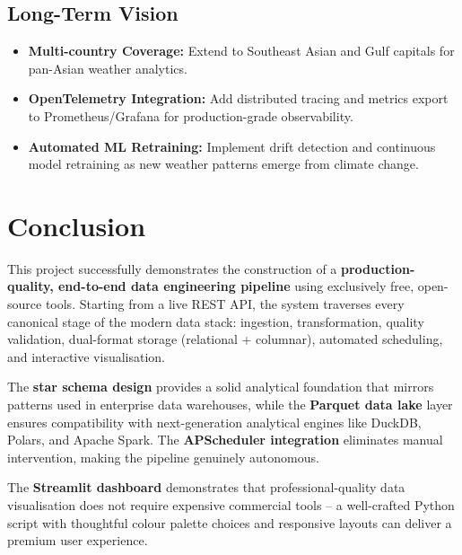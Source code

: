 \documentclass[12pt,a4paper]{report}
\begin{document}
\section{Long-Term Vision}

\begin{itemize}
  \item \textbf{Multi-country Coverage:} Extend to Southeast Asian and Gulf capitals for pan-Asian weather analytics.
  \item \textbf{OpenTelemetry Integration:} Add distributed tracing and metrics export to Prometheus/Grafana for production-grade observability.
  \item \textbf{Automated ML Retraining:} Implement drift detection and continuous model retraining as new weather patterns emerge from climate change.
\end{itemize}

\chapter{Conclusion}

This project successfully demonstrates the construction of a \textbf{production-quality, end-to-end data engineering pipeline} using exclusively free, open-source tools. Starting from a live REST API, the system traverses every canonical stage of the modern data stack: ingestion, transformation, quality validation, dual-format storage (relational + columnar), automated scheduling, and interactive visualisation.

The \textbf{star schema design} provides a solid analytical foundation that mirrors patterns used in enterprise data warehouses, while the \textbf{Parquet data lake} layer ensures compatibility with next-generation analytical engines like DuckDB, Polars, and Apache Spark. The \textbf{APScheduler integration} eliminates manual intervention, making the pipeline genuinely autonomous.

The \textbf{Streamlit dashboard} demonstrates that professional-quality data visualisation does not require expensive commercial tools -- a well-crafted Python script with thoughtful colour palette choices and responsive layouts can deliver a premium user experience.
\end{document}
